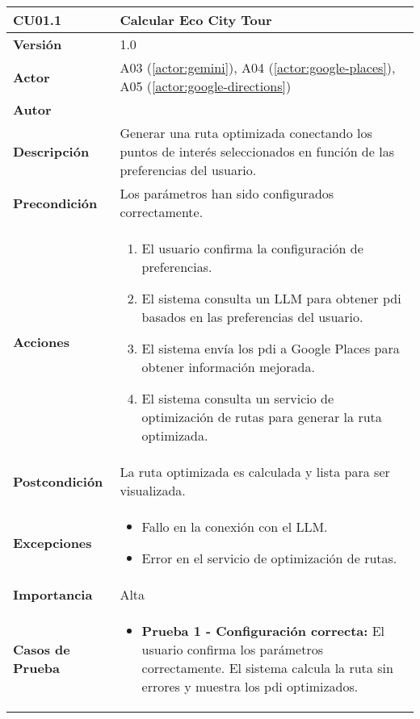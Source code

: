 \begin{table}[H]
	\centering
	\begin{tabularx}{\linewidth}{ p{} p{} }
		\toprule
		\textbf{CU01.1}    & \textbf{Calcular Eco City Tour} \\
		\toprule
		\textbf{Versión}              & 1.0    \\
		\textbf{Actor}                & A03 (\ref{actor:gemini}), A04 (\ref{actor:google-places}), A05 (\ref{actor:google-directions}) \\
		\textbf{Autor}                & \autor \\
		\textbf{Descripción}          & Generar una ruta optimizada conectando los puntos de interés seleccionados en función de las preferencias del usuario. \\
		\textbf{Precondición}         & Los parámetros han sido configurados correctamente. \\
		\textbf{Acciones}             &
		\begin{enumerate}
			\def\labelenumi{\arabic{enumi}.}
			\tightlist
			\item El usuario confirma la configuración de preferencias.
			\item El sistema consulta un LLM para obtener \acrshort{pdi} basados en las preferencias del usuario.
			\item El sistema envía los \acrshort{pdi} a Google Places para obtener información mejorada.
			\item El sistema consulta un servicio de optimización de rutas para generar la ruta optimizada.
		\end{enumerate}\\
		\textbf{Postcondición}        & La ruta optimizada es calculada y lista para ser visualizada. \\
		\textbf{Excepciones}          & 
		\begin{itemize}
			\tightlist
			\item Fallo en la conexión con el LLM.
			\item Error en el servicio de optimización de rutas.
		\end{itemize}\\
		\textbf{Importancia}          & Alta \\
		\textbf{Casos de Prueba}      &
		\begin{itemize}
			\item \textbf{Prueba 1 - Configuración correcta:} El usuario confirma los parámetros correctamente. El sistema calcula la ruta sin errores y muestra los \acrlong{pdi} optimizados.

\end{itemize}
\end{tabularx}
\end{table}
